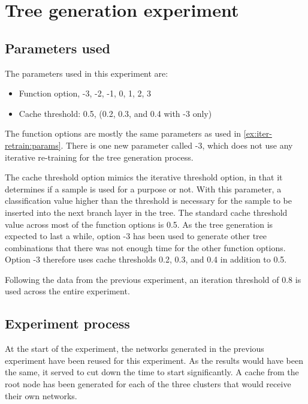 
\section{Tree generation experiment}
\label{ex:tree}
\subsection{Parameters used}
\label{ex:treeparam}

The parameters used in this experiment are:

\begin{itemize}
    \item Function option, -3, -2, -1, 0, 1, 2, 3
    \item Cache threshold: 0.5, (0.2, 0.3, and 0.4 with -3 only)
\end{itemize}{}

The function options are mostly the same parameters as used in \cref{ex:iter-retrain:params}.
There is one new parameter called -3, which does not use any iterative re-training for the tree generation process.

The cache threshold option mimics the iterative threshold option, in that it determines if a sample is used for a purpose or not.
With this parameter, a classification value higher than the threshold is necessary for the sample to be inserted into the next branch layer in the tree.
The standard cache threshold value across most of the function options is 0.5.
As the tree generation is expected to last a while, option -3 has been used to generate other tree combinations that there was not enough time for the other function options.
Option -3 therefore uses cache thresholds 0.2, 0.3, and 0.4 in addition to 0.5.

Following the data from the previous experiment, an iteration threshold of 0.8 is used across the entire experiment.

\subsection{Experiment process}
At the start of the experiment, the networks generated in the previous experiment have been reused for this experiment.
As the results would have been the same, it served to cut down the time to start significantly.
A cache from the root node has been generated for each of the three clusters that would receive their own networks.

